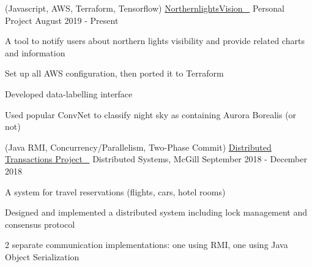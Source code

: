 


\begin{cventries}


\cventry
{(Javascript, AWS, Terraform, Tensorflow)} %
{\href{https://github.com/stumash/northern-lights-vision}{NorthernlightsVision \ \faGithubSquare\acvHeaderIconSep}} %
{Personal Project} %
{August 2019 - Present} %
{ %
\begin{cvitems}
\item {A tool to notify users about northern lights visibility and provide related charts and information}
\item {Set up all AWS configuration, then ported it to Terraform}
\item {Developed data-labelling interface}
\item {Used popular ConvNet to classify night sky as containing Aurora Borealis (or not)}
\end{cvitems}
}


\cventry
{(Java RMI, Concurrency/Parallelism, Two-Phase Commit)} %
{\href{https://github.com/stumash/DistributedSystemsProject}{Distributed Transactions Project \ \faGithubSquare\acvHeaderIconSep}} %
{Distributed Systems, McGill} %
{September 2018 - December 2018} %
{ %
\begin{cvitems}
\item {A system for travel reservations (flights, cars, hotel rooms)}
\item {Designed and implemented a distributed system including lock management and consensus protocol}
\item {2 separate communication implementations: one using RMI, one using Java Object Serialization}
\end{cvitems}
}


\end{cventries}
